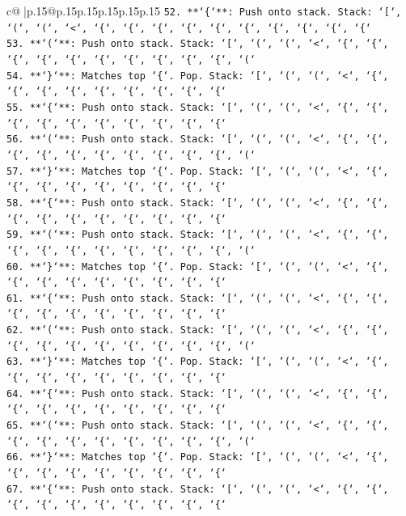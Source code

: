\documentclass{article}
\begin{document}
{\begin{supertabular}{c@{$\;$}|p{.15\linewidth}@{}p{.15\linewidth}p{.15\linewidth}p{.15\linewidth}p{.15\linewidth}p{.15\linewidth}}
{{{\texttt{52. **`\{`**: Push onto stack. Stack: `{[}`, `(`, `(`, `<`, `\{`, `\{`, `\{`, `\{`, `\{`, `\{`, `\{`, `\{`, `\{`, `\{`} \\
\texttt{53. **`(`**: Push onto stack. Stack: `{[}`, `(`, `(`, `<`, `\{`, `\{`, `\{`, `\{`, `\{`, `\{`, `\{`, `\{`, `\{`, `\{`, `(`} \\
\texttt{54. **`\}`**: Matches top `\{`. Pop. Stack: `{[}`, `(`, `(`, `<`, `\{`, `\{`, `\{`, `\{`, `\{`, `\{`, `\{`, `\{`, `\{`} \\
\texttt{55. **`\{`**: Push onto stack. Stack: `{[}`, `(`, `(`, `<`, `\{`, `\{`, `\{`, `\{`, `\{`, `\{`, `\{`, `\{`, `\{`, `\{`} \\
\texttt{56. **`(`**: Push onto stack. Stack: `{[}`, `(`, `(`, `<`, `\{`, `\{`, `\{`, `\{`, `\{`, `\{`, `\{`, `\{`, `\{`, `\{`, `(`} \\
\texttt{57. **`\}`**: Matches top `\{`. Pop. Stack: `{[}`, `(`, `(`, `<`, `\{`, `\{`, `\{`, `\{`, `\{`, `\{`, `\{`, `\{`, `\{`} \\
\texttt{58. **`\{`**: Push onto stack. Stack: `{[}`, `(`, `(`, `<`, `\{`, `\{`, `\{`, `\{`, `\{`, `\{`, `\{`, `\{`, `\{`, `\{`} \\
\texttt{59. **`(`**: Push onto stack. Stack: `{[}`, `(`, `(`, `<`, `\{`, `\{`, `\{`, `\{`, `\{`, `\{`, `\{`, `\{`, `\{`, `\{`, `(`} \\
\texttt{60. **`\}`**: Matches top `\{`. Pop. Stack: `{[}`, `(`, `(`, `<`, `\{`, `\{`, `\{`, `\{`, `\{`, `\{`, `\{`, `\{`, `\{`} \\
\texttt{61. **`\{`**: Push onto stack. Stack: `{[}`, `(`, `(`, `<`, `\{`, `\{`, `\{`, `\{`, `\{`, `\{`, `\{`, `\{`, `\{`, `\{`} \\
\texttt{62. **`(`**: Push onto stack. Stack: `{[}`, `(`, `(`, `<`, `\{`, `\{`, `\{`, `\{`, `\{`, `\{`, `\{`, `\{`, `\{`, `\{`, `(`} \\
\texttt{63. **`\}`**: Matches top `\{`. Pop. Stack: `{[}`, `(`, `(`, `<`, `\{`, `\{`, `\{`, `\{`, `\{`, `\{`, `\{`, `\{`, `\{`} \\
\texttt{64. **`\{`**: Push onto stack. Stack: `{[}`, `(`, `(`, `<`, `\{`, `\{`, `\{`, `\{`, `\{`, `\{`, `\{`, `\{`, `\{`, `\{`} \\
\texttt{65. **`(`**: Push onto stack. Stack: `{[}`, `(`, `(`, `<`, `\{`, `\{`, `\{`, `\{`, `\{`, `\{`, `\{`, `\{`, `\{`, `\{`, `(`} \\
\texttt{66. **`\}`**: Matches top `\{`. Pop. Stack: `{[}`, `(`, `(`, `<`, `\{`, `\{`, `\{`, `\{`, `\{`, `\{`, `\{`, `\{`, `\{`} \\
\texttt{67. **`\{`**: Push onto stack. Stack: `{[}`, `(`, `(`, `<`, `\{`, `\{`, `\{`, `\{`, `\{`, `\{`, `\{`, `\{`, `\{`, `\{`} \\
}}}
\end{supertabular}}
\end{document}
